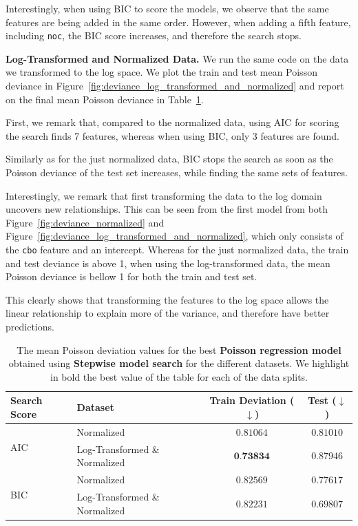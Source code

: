 Interestingly, when using BIC to score the models, we observe that the same features are being added in the same order. However, when adding a fifth feature, including \texttt{noc}, the BIC score increases, and therefore the search stops. 

\textbf{Log-Transformed and Normalized Data.}
We run the same code on the data we transformed to the log space. We plot the train and test mean Poisson deviance in Figure~\ref{fig:deviance_log_transformed_and_normalized} and report on the final mean Poisson deviance in Table~\ref{tab:mean_poisson_deviation_poisson_regression_step_search}.

First, we remark that, compared to the normalized data, using AIC for scoring the search finds 7 features, whereas when using BIC, only 3 features are found.

Similarly as for the just normalized data, BIC stops the search as soon as the Poisson deviance of the test set increases, while finding the same sets of features.

Interestingly, we remark that first transforming the data to the log domain uncovers new relationships. This can be seen from the first model from both Figure~\ref{fig:deviance_normalized} and Figure~\ref{fig:deviance_log_transformed_and_normalized}, which only consists of the \texttt{cbo} feature and an intercept. 
Whereas for the just normalized data, the train and test deviance is above 1, when using the log-transformed data, the mean Poisson deviance is bellow 1 for both the train and test set.

This clearly shows that transforming the features to the log space allows the linear relationship to explain more of the variance, and therefore have better predictions.


\begin{table}[tbp]
    \centering
    \begin{tabular}{ll|cc}
         \toprule
         Search Score & Dataset & Train Deviation ($\downarrow$) & Test ($\downarrow$)  \\
         \midrule
         \multirow{2}{*}{AIC} & Normalized & $0.81064$ & $0.81010$ \\
         &Log-Transformed \& Normalized & $\textbf{0.73834}$ & $0.87946$ \\
         \midrule
         \multirow{2}{*}{BIC} & Normalized & $ 0.82569$ & $0.77617$ \\
         &Log-Transformed \& Normalized & ${0.82231}$ & $\mathbf{0.69807}$ \\
         \bottomrule
    \end{tabular}
    \caption{The mean Poisson deviation values for the best \textbf{Poisson regression model} obtained using \textbf{Stepwise model search} for the different datasets. We highlight in bold the best value of the table for each of the data splits.}
    \label{tab:mean_poisson_deviation_poisson_regression_step_search}
\end{table}


